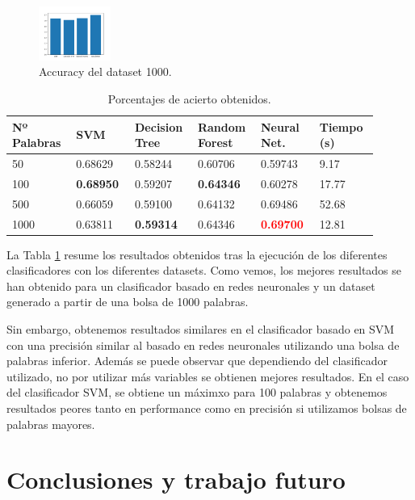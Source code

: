 \documentclass[11pt,a4paper]{article}
\begin{document}
\begin{figure}[H]
\centering
\includegraphics[width=0.21\textwidth]{.//1000.png}
\caption{Accuracy del dataset 1000.}
\label{A_1000}
\end{figure}

\begin{table}[ht]
\caption{Porcentajes de acierto obtenidos.}
\label{accuracy}
\centering
\begin{tabular}{p{0.15\linewidth}p{0.15\linewidth}p{0.15\linewidth}p{0.15\linewidth}p{0.15\linewidth}p{0.15\linewidth}}
\hline
Nº Palabras & SVM & Decision Tree & Random Forest & Neural Net. & Tiempo (s)\\
\hline
50 & 0.68629 & 0.58244 & 0.60706 & 0.59743 & 9.17\\
100 & \textbf{0.68950} & 0.59207 & \textbf{0.64346} & 0.60278 & 17.77\\
500 & 0.66059 & 0.59100 & 0.64132 & 0.69486 & 52.68\\
1000 & 0.63811 & \textbf{0.59314} & 0.64346 & \textbf{\textcolor{red}{0.69700}} & 12.81\\
\hline
\end{tabular}
\end{table}

La Tabla \ref{accuracy} resume los resultados obtenidos tras la ejecución de los diferentes clasificadores con los diferentes datasets. Como vemos, los mejores resultados se han obtenido para un clasificador basado en redes neuronales y un dataset generado a partir de una bolsa de 1000 palabras.

Sin embargo, obtenemos resultados similares en el clasificador basado en SVM con una precisión similar al basado en redes neuronales utilizando una bolsa de palabras inferior. Además se puede observar que dependiendo del clasificador utilizado, no por utilizar más variables se obtienen mejores resultados. En el caso del clasificador SVM, se obtiene un máximxo para 100 palabras y obtenemos resultados peores tanto en performance como en precisión si utilizamos bolsas de palabras mayores.

\section{Conclusiones y trabajo futuro}
\end{document}
